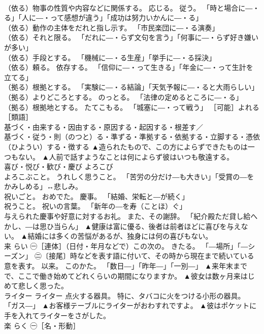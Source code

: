\documentclass[8pt]{extreport}
\begin{document}
\begin{CJK}{UTF8}{min}
\\	（依る）物事の性質や内容などに関係する。 応じる。 従う。 「時と場合に―・る」「人に―・って感想が違う」「成功は努力いかんに―・る」 
\\	（依る）動作の主体をだれと指し示す。 「市民楽団に―・る演奏」 
\\	（依る）それと限る。 「だれに―・らず文句を言う」「何事に―・らず好き嫌いが多い」 
\\	（依る）手段とする。 「機械に―・る生産」「挙手に―・る採決」 
\\	（依る）頼る。 依存する。 「信仰に―・って生きる」「年金に―・って生計を立てる」 
\\	（拠る）根拠とする。 「実験に―・る結論」「天気予報に―・ると大雨らしい」 
\\	（拠る）よりどころとする。 のっとる。 「法律の定めるところに―・る」 
\\	（拠る）根拠地とする。 たてこもる。 「城塞に―・って戦う」 ［可能］よれる ［類語］
\\	基づく・由来する・因由する・原因する・起因する・根差す／
\\	基づく・従う・則（のつと）る・準ずる・準拠する・依拠する・立脚する・憑依（ひようい）する・徴する	▲造られたもので、この方によらずできたものは一つもない。 ▲人前で話すようなことは何によらず彼はいつも敬遠する。
\\	喜び・悦び・歓び・慶び	よろこび	
\\	よろこぶこと。 うれしく思うこと。 「苦労の分だけ―も大きい」「受賞の―をかみしめる」↔悲しみ。 
\\	祝いごと。 おめでた。 慶事。 「結婚、栄転と―が続く」 
\\	祝うこと。 祝いの言葉。 「新年の―を寿（ことほ）ぐ」 
\\	与えられた慶事や好意に対するお礼。 また、その謝辞。 「紀介殿ただ貸し給へかし、―は思ひ当らん」	▲健康は富に優る、後者は前者ほどに喜びを与えない。 ▲結婚には多くの苦悩があるが、独身には何の喜びもない。
\\	来	らい	㊀［連体］（日付・年月などで）この次の。 きたる。 「―場所」「―シーズン」 ㊁〔接尾〕時などを表す語に付いて、その時から現在まで続いている意を表す。 以来。 このかた。 「数日―」「昨年―」「一別―」	▲来年末までで、ここで働き始めてどれくらいの期間になりますか。 ▲彼女は数ヶ月来はじめて悲しく思った。
\\	ライター	ライター	点火する器具。 特に、タバコに火をつける小形の器具。 「ガス―」	▲お客様テーブルにライターがおわすれですよ。 ▲彼はポケットに手を入れてライターをさがした。
\\	楽	らく	㊀［名・形動］ 

\end{CJK}
\end{document}

